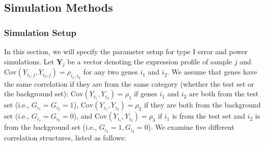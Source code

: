 \documentclass[a4,center,fleqn]{NAR}
\newcommand{\OurMethod}{MEQLEA}
\begin{document}
	
	\subsection{Simulation Methods}
	
	\subsubsection{Simulation Setup}\label{subsection:simulation}
	In this section, we will specify the parameter setup for type I error and power simulations. %
	Let $\bm Y_{j}$ be a vector denoting the expression profile of sample $j$ and $\text{Cov}(Y_{i_1, j}, Y_{i_2, j})=\rho_{i_1,i_2}$ for any two genes $i_1$ and $i_2$. 
	We assume that genes have the same correlation if they are from the same category (whether the test set or the background set): $\text{Cov}(Y_{i_1}, Y_{i_2})= \rho_1$ if
	genes $i_1$ and $i_2$ are both from the test set (i.e., $G_{i_1} = G_{i_2}=1$), 
	$\text{Cov}(Y_{i_1}, Y_{i_2}) =\rho_2$ if they are both from the background set (i.e., $G_{i_1} =
	G_{i_2}=0$), and  $\text{Cov}(Y_{i_1}, Y_{i_2})= \rho_3$ if $i_1$ is from the test set and $i_2$ is
	from the background set (i.e., $G_{i_1} =1,  G_{i_2}=0$). We examine five different correlation
	structures, listed as follows:
	
\end{document}
